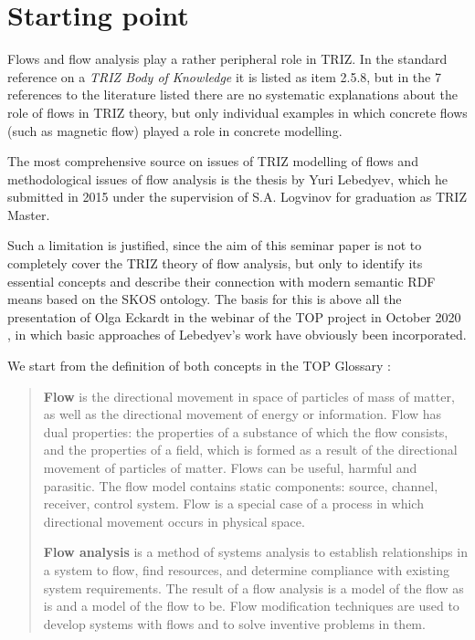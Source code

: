 \documentclass[a4paper,11pt]{article}
\begin{document}
\section{Starting point} 

Flows and flow analysis play a rather peripheral role in TRIZ.  In the
standard reference \cite{Petrov2007} on a \emph{TRIZ Body of Knowledge} it is
listed as item 2.5.8, but in the 7 references to the literature listed there
are no systematic explanations about the role of flows in TRIZ theory, but
only individual examples in which concrete flows (such as magnetic flow)
played a role in concrete modelling.

The most comprehensive source on issues of TRIZ modelling of flows and
methodological issues of flow analysis is the thesis \cite{Lebedyev2015} by
Yuri Lebedyev, which he submitted in 2015 under the supervision of S.A. 
Logvinov for graduation as TRIZ Master.

Such a limitation is justified, since the aim of this seminar paper is not to
completely cover the TRIZ theory of flow analysis, but only to identify its
essential concepts and describe their connection with modern semantic RDF
means based on the SKOS ontology. The basis for this is above all the
presentation of Olga Eckardt in the webinar of the TOP project in October 2020
\cite{Eckardt2020}, in which basic approaches of Lebedyev's work have
obviously been incorporated.

We start from the definition of both concepts in the TOP Glossary
\cite{TOP-Glossary}: 
\begin{quote}
\textbf{Flow} is the directional movement in space of particles of mass of
matter, as well as the directional movement of energy or information. Flow
has dual properties: the properties of a substance of which the flow
consists, and the properties of a field, which is formed as a result of the
directional movement of particles of matter. Flows can be useful, harmful
and parasitic. The flow model contains static components: source, channel,
receiver, control system. Flow is a special case of a process in which
directional movement occurs in physical space.

\textbf{Flow analysis} is a method of systems analysis to establish
relationships in a system to flow, find resources, and determine compliance
with existing system requirements. The result of a flow analysis is a model
of the flow as is and a model of the flow to be. Flow modification
techniques are used to develop systems with flows and to solve inventive
problems in them.
\end{quote}
\end{document}

